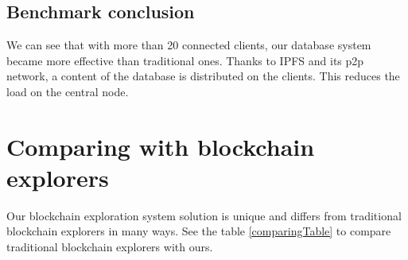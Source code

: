 \subsection{Benchmark conclusion}
We can see that with more than 20 connected clients, our database system became more effective than traditional ones. Thanks to IPFS and its p2p network, a content of the database is distributed on the clients. This reduces the load on the central node.

\section{Comparing with blockchain explorers}
Our blockchain exploration system solution is unique and differs from traditional blockchain explorers in many ways. See the table \ref{comparingTable} to compare traditional blockchain explorers with ours. 

